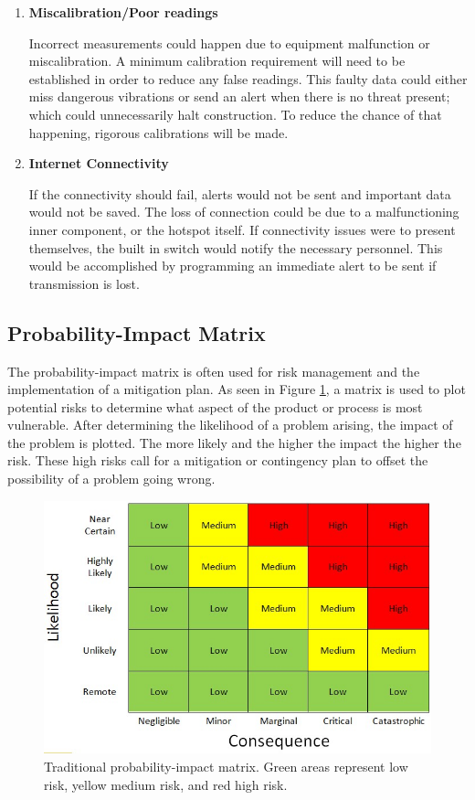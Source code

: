 \documentclass[12pt]{article}
\begin{document}
\begin{enumerate}
\item \noindent \textbf{Miscalibration/Poor readings}\vspace{1mm}

\noindent Incorrect measurements could happen due to equipment malfunction or miscalibration. A minimum calibration requirement will need to be established in order to reduce any false readings. This faulty data could either miss dangerous vibrations or send an alert when there is no threat present; which could unnecessarily halt construction. To reduce the chance of that happening, rigorous calibrations will be made. \\

\item \noindent \textbf{Internet Connectivity}\vspace{1mm}

\noindent If the connectivity should fail, alerts would not be sent and important data would not be saved. The loss of connection could be due to a malfunctioning inner component, or the hotspot itself. If connectivity issues were to present themselves, the built in switch would notify the necessary personnel. This would be accomplished by programming an immediate alert to be sent if transmission is lost. 
\end{enumerate}

\subsection{Probability-Impact Matrix}
The probability-impact matrix is often used for risk management and the implementation of a mitigation plan. As seen in Figure \ref{fig:likelihood_vs_impact}, a matrix is used to plot potential risks to determine what aspect of the product or process is most vulnerable. After determining the likelihood of a problem arising, the impact of the problem is plotted. The more likely and the higher the impact the higher the risk. These high risks call for a mitigation or contingency plan to offset the possibility of a problem going wrong.
\begin{figure}[H]
    \centering
    \includegraphics[width=.6\textwidth]{src/likelihood_vs_impact.png}
    \caption{Traditional probability-impact matrix. Green areas represent low risk, yellow medium risk, and red high risk.}
    \label{fig:likelihood_vs_impact}
\end{figure}
\end{document}
